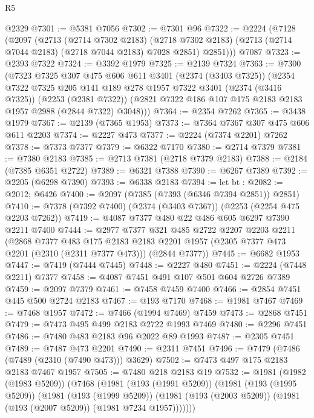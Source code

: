 \begin{lexlean}{R5}
\begin{coremodule}
    @2329
@7301 := @5381 @7056
@7302 := @7301 @96
@7322 := @2224
    (@7128
      (@2097
        (@2713
          (@2714 @7302 @2183)
          (@2718 @7302 @2183)
          (@2713 (@2714 @7044 @2183) (@2718 @7044 @2183) @7028 @2851)
          @2851)))
    @7087
@7323 := @2393 @7322
@7324 := @3392 @1979
@7325 := @2139 @7324
@7363 := @7300
    (@7323
      @7325
      @307
      @475
      @606
      @611
      @3401
      (@2374 (@3403 @7325))
      (@2354
        @7322
        @7325
        @205
        @141
        @189
        @278
        @1957
        @7322
        @3401
        (@2374 (@3416 @7325))
        (@2253 (@2381 @7322))
        (@2821 @7322 @186 @107 @175 @2183 @2183 @1957 @2988 (@2844 @7322) @3048)))
@7364 := @2354 @7262
@7365 := @3438 @1979
@7367 := @2139 (@7365 @1953)
@7373 := @7364 @7367 @307 @475 @606 @611 @2203
@7374 := @2227 @473
@7377 := @2224 (@7374 @2201) @7262
@7378 := @7373 @7377
@7379 := @6322 @7170
@7380 := @2714 @7379
@7381 := @7380 @2183
@7385 := @2713 @7381 (@2718 @7379 @2183)
@7388 := @2184 (@7385 @6351 @2722)
@7389 := @6321 @7388
@7390 := @6267 @7389
@7392 := @2205 (@6298 @7390)
@7393 := @6338 @2183
@7394 := let bt : @2082 := @2012; @6426
@7400 := @2097 (@7385 (@7393 (@6346 @7394 @2851)) @2851)
@7410 := @7378 (@7392 @7400) (@2374 (@3403 @7367)) (@2253 (@2254 @475 @2203 @7262))
@7419 := @4087 @7377 @480 @22 @486 @605 @6297 @7390 @2211 @7400
@7444 := @2977
    @7377
    @321
    @485
    @2722
    @2207
    @2203
    @2211
    (@2868
      @7377
      @483
      @175
      @2183
      @2183
      @2201
      @1957
      (@2305 @7377 @473 @2201 (@2310 (@2311 @7377 @473)))
      (@2844 @7377))
@7445 := @6682 @1953
@7447 := @7419 (@7444 @7445)
@7448 := @2227 @480
@7451 := @2224 (@7448 @2211) @7377
@7458 := @4087 @7451 @491 @107 @501 @604 @2726 @7389
@7459 := @2097 @7379
@7461 := @7458 @7459 @7400
@7466 := @2854 @7451 @445 @500 @2724 @2183
@7467 := @193 @7170
@7468 := @1981 @7467
@7469 := @7468 @1957
@7472 := @7466 (@1994 @7469) @7459
@7473 := @2868 @7451
@7479 := @7473 @495 @499 @2183 @2722 @1993 @7469
@7480 := @2296 @7451
@7486 := @7480 @483 @2183 @96 @2022 @89 @1993
@7487 := @2305 @7451
@7489 := @7487 @473 @2201
@7490 := @2311 @7451
@7496 := @7479 (@7486 (@7489 (@2310 (@7490 @473))) @3629)
@7502 := @7473 @497 @175 @2183 @2183 @7467 @1957
@7505 := @7480 @218 @2183 @19
@7532 := @1981
    (@1982 (@1983 @5209))
    (@7468
      (@1981
        (@193 (@1991 @5209))
        (@1981
          (@193 (@1995 @5209))
          (@1981
            (@193 (@1999 @5209))
            (@1981 (@193 (@2003 @5209)) (@1981 (@193 (@2007 @5209)) (@1981 @7234 @1957)))))))

\end{coremodule}
\end{lexlean}
